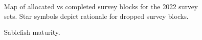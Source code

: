 \documentclass[12pt]{article}\usepackage[]{graphicx}\usepackage[]{color}
\begin{document}
\begin{figure}[htb]

{\centering {} 

}

\caption{Map of allocated vs completed survey blocks for the 2022 survey sets. Star symbols depict rationale for dropped survey blocks.}\label{fig:figure5}
\end{figure}
\clearpage


\begin{figure}[htb]

{\centering {} 

}

\caption{Sablefish maturity.}\label{fig:figure6}
\end{figure}
\end{document}
